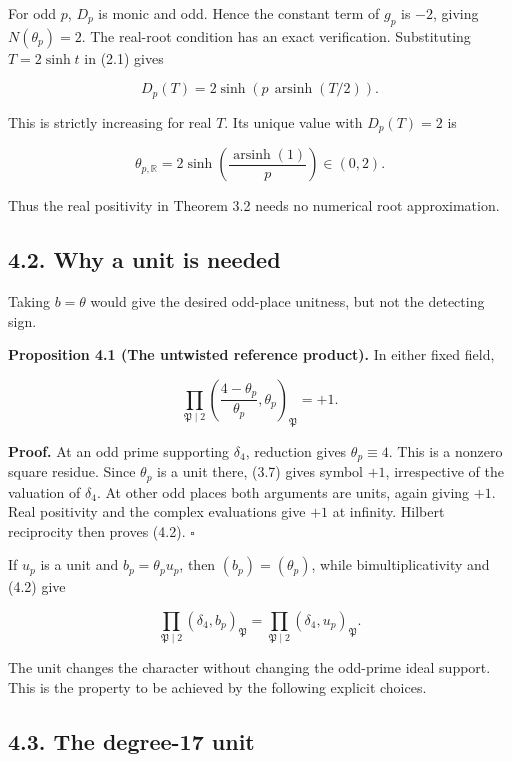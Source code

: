 \documentclass[11pt,a4paper]{article}
\begin{document}
For odd \(p\), \(D_p\) is monic and odd. Hence the constant term of
\(g_p\) is \(-2\), giving \(N(\theta_p)=2\). The real-root condition has
an exact verification. Substituting \(T=2\sinh t\) in (2.1) gives

\[
D_p(T)=2\sinh\!\left(p\,\operatorname{arsinh}(T/2)\right).
\]

This is strictly increasing for real \(T\). Its unique value with
\(D_p(T)=2\) is

\[
\theta_{p,\mathbb R}
=2\sinh\!\left(\frac{\operatorname{arsinh}(1)}p\right)
\in(0,2).
\tag{4.1}
\]

Thus the real positivity in Theorem 3.2 needs no numerical root
approximation.

\subsection{4.2. Why a unit is needed}\label{bare-detector}

Taking \(b=\theta\) would give the desired odd-place unitness, but not
the detecting sign.

\protect{}\label{prop-bare-theta}
\textbf{Proposition 4.1 (The untwisted reference product).} In either
fixed field,

\[
\prod_{\mathfrak P\mid2}
\left(\frac{4-\theta_p}{\theta_p},\theta_p\right)_{\mathfrak P}
=+1.
\tag{4.2}
\]

\textbf{Proof.} At an odd prime supporting \(\delta_4\), reduction gives
\(\theta_p\equiv4\). This is a nonzero square residue. Since
\(\theta_p\) is a unit there, (3.7) gives symbol \(+1\), irrespective of
the valuation of \(\delta_4\). At other odd places both arguments are
units, again giving \(+1\). Real positivity and the complex evaluations
give \(+1\) at infinity. Hilbert reciprocity then proves (4.2).
\(\square\)

If \(u_p\) is a unit and \(b_p=\theta_pu_p\), then \((b_p)=(\theta_p)\),
while bimultiplicativity and (4.2) give

\[
\prod_{\mathfrak P\mid2}(\delta_4,b_p)_{\mathfrak P}
=
\prod_{\mathfrak P\mid2}(\delta_4,u_p)_{\mathfrak P}.
\tag{4.3}
\]

The unit changes the character without changing the odd-prime ideal
support. This is the property to be achieved by the following explicit
choices.

\subsection{4.3. The degree-17 unit}\label{detector17}
\end{document}
